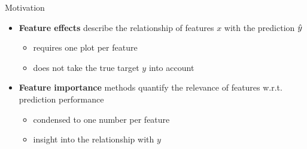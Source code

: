 	
	
	

	

\begin{vbframe}{Motivation}
\begin{itemize}
  \item \textbf{Feature effects} describe the relationship of features $x$ with the prediction $\yh$
  \begin{itemize}
    \item requires one plot per feature
    \item does not take the true target $y$ into account
  \end{itemize}
  \item \textbf{Feature importance} methods quantify the relevance of features w.r.t. prediction performance
  \begin{itemize}
    \item condensed to one number per feature
    \item insight into the relationship with $y$
  \end{itemize}
\end{itemize}
\end{vbframe}

